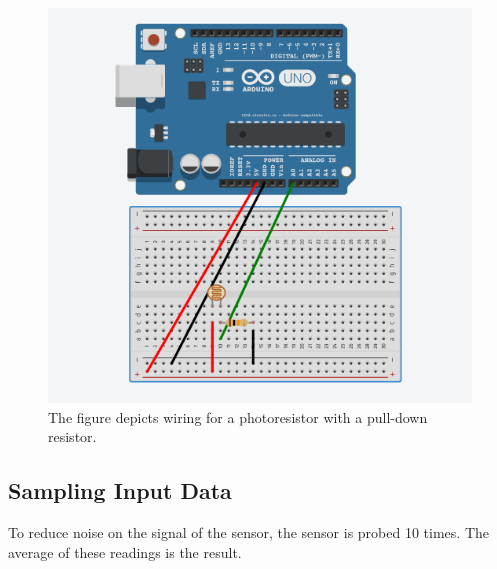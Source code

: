 \begin{figure}[htbp]
  \centering
  \includegraphics[width=\textwidth]{Implementation/PhotoSensorTests/Images/photoresistor_setup.png}
  \caption[Photoresistor]{The figure depicts wiring for a photoresistor with a pull-down resistor.}\label{fig:arduino_photoresistor_wiring}
\end{figure}

\subsection{Sampling Input Data}
To reduce noise on the signal of the sensor, the sensor is probed 10 times. The average of these readings is the result.
